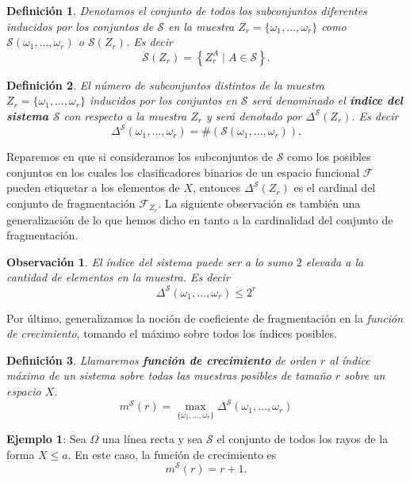 \documentclass{report}
\newtheorem{dfn}{Definición}[section]
\newtheorem{obs}{Observación}[section]
\begin{document}
\begin{dfn}
Denotamos el conjunto de todos los subconjuntos diferentes inducidos por los 
conjuntos de \( \mathcal{S} \) en la muestra \( Z_r = \{\omega_1, \dots, \omega_r\} \) como \( \mathcal{S}(\omega_1, \dots, \omega_r) \) 
o \( \mathcal{S}(Z_r) \). Es decir
\[
    \mathcal{S}(Z_r) =  \left\{Z_r^A \mid A \in \mathcal{S}\right\}.
\]
\end{dfn}
\bigskip

\begin{dfn}
El número de subconjuntos distintos de la muestra \( Z_r = \{\omega_1, \dots, \omega_r\} \) 
inducidos por los conjuntos en \( \mathcal{S} \) será denominado el \textbf{índice 
del sistema \( \mathcal{S} \)} con respecto a la muestra \( Z_r \) 
y será denotado por $\Delta^{\mathcal{S}}(Z_r)$. Es decir
\[
\Delta^{\mathcal{S}}(\omega_1, \dots, \omega_r) = \#\left(\mathcal{S}(\omega_1, \dots, \omega_r)\right).
\]
\end{dfn}

Reparemos en que si consideramos los subconjuntos de $\mathcal{S}$ como los posibles conjuntos en
los cuales los clasificadores binarios de un espacio funcional $\mathcal{F}$ pueden etiquetar a los
elementos de $X$, entonces $\Delta^{\mathcal{S}}(Z_r)$ es el cardinal del conjunto de fragmentación $\mathcal{F}_{Z_r}$.
La siguiente observación es también una generalización
de lo que hemos dicho en tanto a la cardinalidad del conjunto de fragmentación.\newline


\begin{obs} El índice del sistema puede ser a lo sumo $2$ elevada a la cantidad de elementos en la muestra. Es decir
\[
    \Delta^{\mathcal{S}}(\omega_1, \dots, \omega_r) \leq 2^r
\]
\end{obs}

Por último, generalizamos la noción de coeficiente de fragmentación en la \textit{función de crecimiento},
tomando el máximo sobre todos los índices posibles.\newline

\begin{dfn}
    Llamaremos \textbf{función de crecimiento} de orden $r$ al índice máximo de un sistema sobre todas las muestras
    posibles de tamaño $r$ sobre un espacio $X$. 
    \[
    m^{\mathcal{S}}(r) = \max_{\{\omega_1,\dots,\omega_r\}}\Delta^{\mathcal{S}}(\omega_1,\dots,\omega_r)
    \]
\end{dfn}
\bigskip

\textbf{Ejemplo 1}: Sea \( \Omega \) una línea recta y sea \( \mathcal{S} \) el conjunto 
de todos los rayos de la forma \( X \leq a \). En este caso, la función de crecimiento es  
\[
m^{\mathcal{S}}(r) = r + 1.
\]
\end{document}
